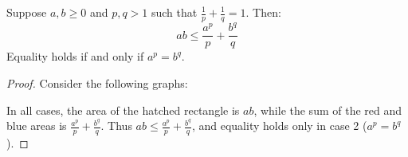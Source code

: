 \documentclass[main.tex]{subfiles}
\begin{document}
\begin{theorem}
    Suppose $a,b\ge 0$ and $p,q>1$ such that $\frac{1}{p}+\frac{1}{q}=1$. Then:
    \begin{equation*}
        ab \le \frac{a^p}{p} + \frac{b^q}{q}
    \end{equation*}
    Equality holds if and only if $a^p=b^q$.
\end{theorem}
\begin{proof}
    Consider the following graphs:
    \begin{center}
        \newcommand*{\YoungsInequalityPlot}[3]{
            \draw[-latex, thick] (0,0) -- (4,0) node[right]{$x$};
            \draw[-latex, thick] (0,0) -- (0,4) node[above]{$y$};
            \fill[color=red!40, domain=0:{#1}] (0,0) -- plot ({\x},{f(\x)}) -- ({#1},0) node[below, color=red!40!black]{$a$} -- cycle;
            \fill[color=blue!40, domain=0:{g(#2)}] (0,0) -- plot ({\x},{f(\x)}) -- (0,{#2}) node[left, color=blue!40!black]{$b$} -- cycle;
            \draw[very thick, smooth, domain=0:4, samples=200] plot(\x,{f(\x)}) node[left]{$y=x^{p-1}$};
            \filldraw[very thick, violet, pattern=north west lines, pattern color=violet] (0,0) rectangle ({#1},{#2});
            \node[shape=ellipse, inner sep=1pt, fill=red!40] at (2.4,0.8) {$\dfrac{a^p}{p}$};
            \node[shape=ellipse, inner sep=1pt, fill=blue!40] at (1.3,2) {$\dfrac{b^q}{q}$};
            \node[font=\sffamily] at (2,-0.7) {#3};
        }
    \end{center}
    In all cases, the area of the hatched rectangle is $ab$, while the sum of the red and blue areas is $\frac{a^p}{p}+\frac{b^q}{q}$. Thus $ab\le\frac{a^p}{p}+\frac{b^q}{q}$, and equality holds only in case 2 ($a^p=b^q$).
\end{proof}
\end{document}
